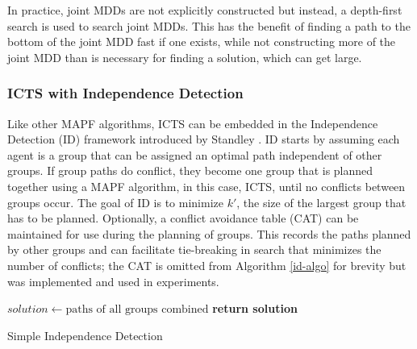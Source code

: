 \documentclass[english]{article}
\begin{document}
	In practice, joint MDDs are not explicitly constructed but instead, a depth-first search is used to search joint MDDs. This has the benefit of finding a path to the bottom of the joint MDD fast if one exists, while not constructing more of the joint MDD than is necessary for finding a solution, which can get large.
	\subsubsection{ICTS with Independence Detection}
	Like other MAPF algorithms, ICTS can be embedded in the Independence Detection (ID) framework introduced by Standley \cite{standley2010}. ID starts by assuming each agent is a group that can be assigned an optimal path independent of other groups. If group paths do conflict, they become one group that is planned together using a MAPF algorithm, in this case, ICTS, until no conflicts between groups occur. The goal of ID is to minimize $k'$, the size of the largest group that has to be planned. Optionally, a conflict avoidance table (CAT) can be maintained for use during the planning of groups. This records the paths planned by other groups and can facilitate tie-breaking in search that minimizes the number of conflicts; the CAT is omitted from Algorithm \ref{id-algo} for brevity but was implemented and used in experiments.
	\begin{algorithm}
		\begin{algorithmic}[1]
			\State {}
			\State {}
			\Repeat
			\State {}
			\State {}
			\State {}
			\State $solution\gets\text{paths of all groups combined}$
			\State \textbf{return solution}
		\end{algorithmic}
		\caption{Simple Independence Detection \cite{standley2010}} 
		\label{id-algo}
	\end{algorithm}
\end{document}
